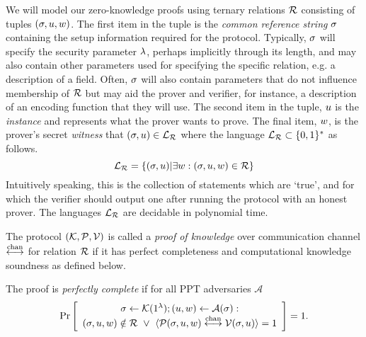 We will model our zero-knowledge proofs using ternary relations $\mathcal{R}$ consisting of tuples $(\mathsf{\sigma}, u,w)$. The first item in the tuple is the \emph{common reference string} $\mathsf{\sigma}$ containing the setup information required for the protocol. Typically, $\mathsf{\sigma}$ will specify the security parameter $\lambda$, perhaps implicitly through its length, and may also contain other parameters used for specifying the specific relation, e.g. a description of a field. Often, $\mathsf{\sigma}$ will also contain parameters that do not influence membership of $\mathcal{R}$ but may aid the prover and verifier, for instance, a description of an encoding function that they will use. The second item in the tuple, $u$ is the \emph{instance} and represents what the prover wants to prove. The final item, $w$, is the prover's secret \emph{witness} that $(\mathsf{\sigma},u)\in\mathcal{L}_{\mathcal{R}}$ where the language $\mathcal{L}_{\mathcal{R}} \subset \{0,1\}^*$ as follows.
\[ \mathcal{L}_{\mathcal{R}}=\{(\mathsf{\sigma},u)|\exists w: (\mathsf{\sigma},u,w)\in \mathcal{R}\} \]
Intuitively speaking, this is the collection of statements which are `true', and for which the verifier should output one after running the protocol with an honest prover. The languages $\mathcal{L}_{\mathcal{R}}$ are decidable in polynomial time.

The protocol $(\mathcal{K},\mathcal{P},\mathcal{V})$ is called a \emph{proof of knowledge} over communication channel $\overset{\textnormal{chan}}{\longleftrightarrow}$ for relation $\mathcal{R}$ if it has perfect completeness and computational knowledge soundness as defined below.

\begin{definition}
The proof is \emph{perfectly complete} if for all PPT adversaries $\mathcal{A}$
$$\Pr \left[ \begin{array}{c} \mathsf{\sigma}\gets \mathcal{K}(1^{\lambda}); (u,w) \leftarrow \mathcal{A}(\mathsf{\sigma}): \\
(\mathsf{\sigma},u,w)\notin \mathcal{R} ~\vee~ \langle \mathcal{P}(\mathsf{\sigma},u,w)\overset{\textnormal{chan}}{\longleftrightarrow}\mathcal{V}(\mathsf{\sigma},u)\rangle=1 \end{array}\right] =1.$$
\end{definition}

